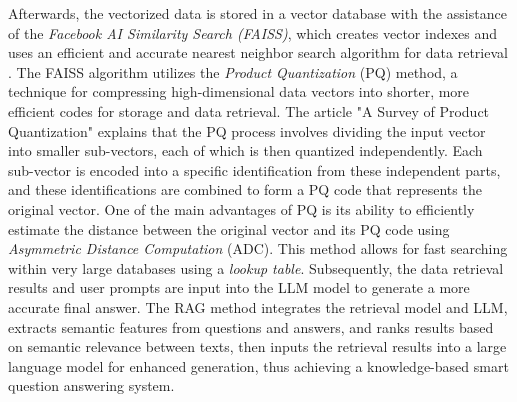 Afterwards, the vectorized data is stored in a vector database with the assistance of the \emph{Facebook AI Similarity Search (FAISS)}, which creates vector indexes and uses an efficient and accurate nearest neighbor search algorithm for data retrieval \cite{10039758}. The FAISS algorithm utilizes the \emph{Product Quantization} (PQ) method, a technique for compressing high-dimensional data vectors into shorter, more efficient codes for storage and data retrieval. The article "A Survey of Product Quantization" explains that the PQ process involves dividing the input vector into smaller sub-vectors, each of which is then quantized independently. Each sub-vector is encoded into a specific identification from these independent parts, and these identifications are combined to form a PQ code that represents the original vector. One of the main advantages of PQ is its ability to efficiently estimate the distance between the original vector and its PQ code using \emph{Asymmetric Distance Computation} (ADC). This method allows for fast searching within very large databases using a \emph{lookup table}. Subsequently, the data retrieval results and user prompts are input into the LLM model to generate a more accurate final answer. The RAG method integrates the retrieval model and LLM, extracts semantic features from questions and answers, and ranks results based on semantic relevance between texts, then inputs the retrieval results into a large language model for enhanced generation, thus achieving a knowledge-based smart question answering system.







